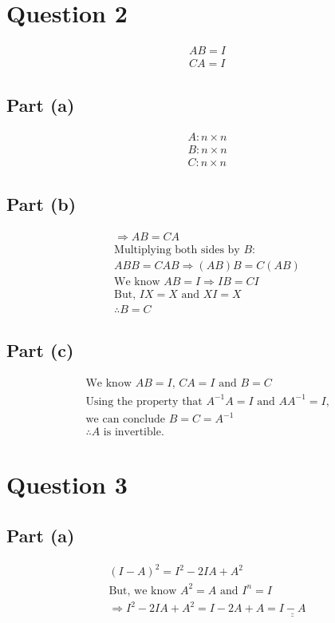 \documentclass[letterpaper,10pt]{article}
\newcommand{\doubleu}[1]{\underline{\underline{#1}}}
\begin{document}
	\section{Question 2}
		\begin{gather*}
			AB = I \\
			CA = I
		\end{gather*}
		\subsection{Part (a)}
			\begin{gather*}
				A: n \times  n \\
				B: n \times n \\
				C: n \times n
			\end{gather*}

		\subsection{Part (b)}
			\begin{gather*}
				\Rightarrow AB = CA \\
				\text{Multiplying both sides by } B \text{:} \\
				ABB = CAB \Rightarrow (AB)B = C(AB) \\
				\text{We know } AB = I \Rightarrow IB = CI \\
				\text{But, } IX = X \text{ and } XI = X \\
				\therefore B = C
			\end{gather*}

		\subsection{Part (c)}
			\begin{gather*}
				\text{We know } AB = I \text{, } CA = I \text{ and } B = C\\
				\text{Using the property that } A^{-1}A = I \text{ and } AA^{-1} = I \text{,} \\
				\text{we can conclude } B = C = A^{-1} \\
				\therefore A \text{ is invertible.}
			\end{gather*}


	\section{Question 3}
		\subsection{Part (a)}
			\begin{gather*}
				(I-A)^2 = I^2-2IA+A^2 \\
				\text{But, we know } A^2 = A \text{ and } I^n = I \\
				\Rightarrow I^2 -2IA + A^2 = I - 2A + A = \doubleu{I-A}
			\end{gather*}
\end{document}

